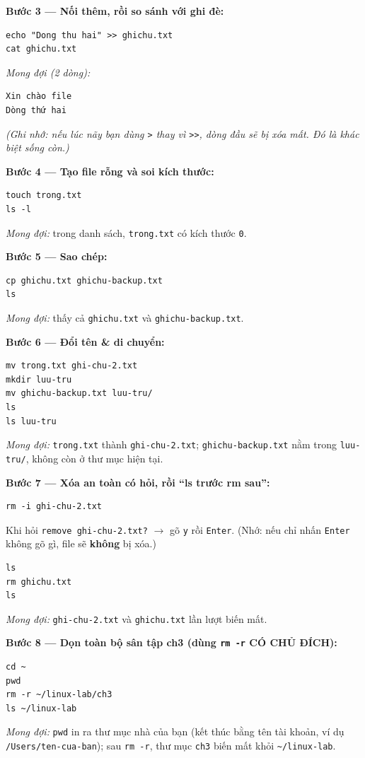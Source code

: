 \documentclass[12pt,a4paper]{article}
\newcommand{\cmd}[1]{\texttt{#1}}
\begin{document}
\textbf{Bước 3 --- Nối thêm, rồi so sánh với ghi đè:}
\begin{Verbatim}
echo "Dong thu hai" >> ghichu.txt
cat ghichu.txt
\end{Verbatim}
\textit{Mong đợi (2 dòng):}
\begin{Verbatim}
Xin chào file
Dòng thứ hai
\end{Verbatim}
\textit{(Ghi nhớ: nếu lúc nãy bạn dùng \cmd{>} thay vì \cmd{>>}, dòng đầu sẽ bị xóa mất. Đó là khác biệt sống còn.)}

\textbf{Bước 4 --- Tạo file rỗng và soi kích thước:}
\begin{Verbatim}
touch trong.txt
ls -l
\end{Verbatim}
\textit{Mong đợi:} trong danh sách, \cmd{trong.txt} có kích thước \cmd{0}.

\textbf{Bước 5 --- Sao chép:}
\begin{Verbatim}
cp ghichu.txt ghichu-backup.txt
ls
\end{Verbatim}
\textit{Mong đợi:} thấy cả \cmd{ghichu.txt} và \cmd{ghichu-backup.txt}.

\textbf{Bước 6 --- Đổi tên \& di chuyển:}
\begin{Verbatim}
mv trong.txt ghi-chu-2.txt
mkdir luu-tru
mv ghichu-backup.txt luu-tru/
ls
ls luu-tru
\end{Verbatim}
\textit{Mong đợi:} \cmd{trong.txt} thành \cmd{ghi-chu-2.txt}; \cmd{ghichu-backup.txt} nằm trong \cmd{luu-tru/}, không còn ở thư mục hiện tại.

\textbf{Bước 7 --- Xóa an toàn có hỏi, rồi ``ls trước rm sau'':}
\begin{Verbatim}
rm -i ghi-chu-2.txt
\end{Verbatim}
Khi hỏi \cmd{remove ghi-chu-2.txt?} $\rightarrow$ gõ \cmd{y} rồi \cmd{Enter}. (Nhớ: nếu chỉ nhấn \cmd{Enter} không gõ gì, file sẽ \textbf{không} bị xóa.)
\begin{Verbatim}
ls
rm ghichu.txt
ls
\end{Verbatim}
\textit{Mong đợi:} \cmd{ghi-chu-2.txt} và \cmd{ghichu.txt} lần lượt biến mất.

\textbf{Bước 8 --- Dọn toàn bộ sân tập ch3 (dùng \cmd{rm -r} CÓ CHỦ ĐÍCH):}
\begin{Verbatim}
cd ~
pwd
rm -r ~/linux-lab/ch3
ls ~/linux-lab
\end{Verbatim}
\textit{Mong đợi:} \cmd{pwd} in ra thư mục nhà của bạn (kết thúc bằng tên tài khoản, ví dụ \cmd{/Users/ten-cua-ban}); sau \cmd{rm -r}, thư mục \cmd{ch3} biến mất khỏi \cmd{\textasciitilde/linux-lab}.
\end{document}
